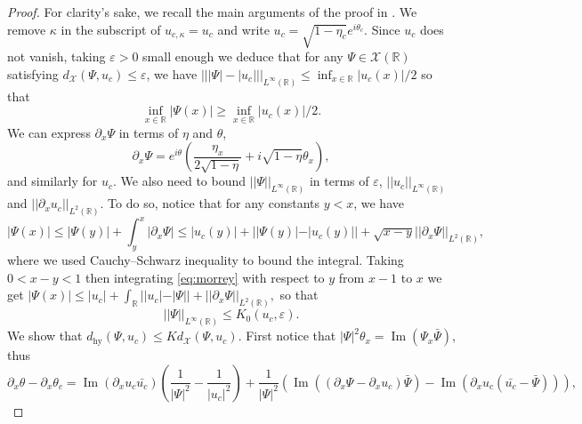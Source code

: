 \documentclass[10pt,a4paper]{amsart}
\renewcommand{\Im}{\operatorname{Im}}
\newcommand{\R}{\mathbb{R}}
\begin{document}
	\begin{proof}
		For clarity's sake, we recall the main arguments of the proof in \cite{chironstab}.
		We remove $\kappa$ in the subscript of $u_{c,\kappa}=u_c$ and write $u_c=\sqrt{1-\eta_c}e^{i\theta_c}$. Since $u_{c}$ does not vanish, taking $\varepsilon>0$ small enough we deduce that for any $\Psi\in\mathcal{X}(\R)$ satisfying $d_\mathcal{X}(\Psi,u_c)\leq\varepsilon$, we have $|||\Psi|-|u_{c}|||_{ L^\infty(\R)}\leq\inf_{x\in\R}|u_c(x)|/2$ so that 
		\begin{equation}\label{eq:closinf}
			\inf_{x\in\R}|\Psi(x)|\geq \inf_{x\in\R}|u_c(x)|/2.
		\end{equation} We can express $\partial_x\Psi$ in terms of $\eta$ and $\theta$,
		\begin{equation}\label{eq:Psiprim}
			\partial_x\Psi=e^{i\theta}\left(\frac{\eta_x}{2\sqrt{1-\eta}}+i\sqrt{1-\eta}\theta_x\right),
		\end{equation} and similarly for $u_c$.
		We also need to bound $||\Psi||_{ L^\infty(\R)}$ in terms of $\varepsilon$, $||u_c||_{ L^\infty(\R)}$ and $||\partial_xu_c||_{ L^2(\R)}$. To do so, notice that for any constants $y<x$, we have
		\begin{equation}\label{eq:morrey}
			|\Psi(x)|\leq|\Psi(y)|+\int_{y}^x|\partial_x\Psi|\leq|u_c(y)|+||\Psi(y)|-|u_c(y)||+\sqrt{x-y}||\partial_x\Psi||_{ L^2(\R)},
		\end{equation} where we used Cauchy--Schwarz inequality to bound the integral. Taking $0<x-y<1$ then integrating \eqref{eq:morrey} with respect to $y$ from $x-1$ to $x$ we get
		$|\Psi(x)|\leq |u_c|+\int_{\R}||u_c|-|\Psi||+||\partial_x\Psi||_{ L^2(\R)},$
		so that
		\begin{equation}\label{eq:inftybound}
			||\Psi||_{ L^\infty(\R)}\leq K_0(u_c,\varepsilon).
		\end{equation} 
		We show that $d_{\mathrm{hy}}(\Psi,u_{c})\leq Kd_\mathcal{X}(\Psi,u_c).$ 
		First notice that $|\Psi|^2\theta_x=\Im(\Psi_x\bar{\Psi})$, thus
		$$\partial_x\theta-\partial_x\theta_c=\Im(\partial_xu_c\bar{u_c})\left(\frac{1}{|\Psi|^2}-\frac{1}{|u_c|^2}\right)+\frac{1}{|\Psi|^2}(\Im((\partial_x\Psi-\partial_xu_c)\bar{\Psi})-\Im(\partial_xu_c(\bar{u_c}-\bar{\Psi}))),$$
		

\end{proof}
\end{document}
